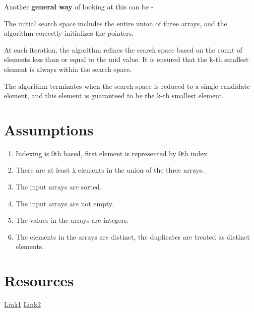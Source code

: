 \documentclass[8pt]{article}
\begin{document}
Another \textbf{general way }of looking at this can be -

The initial search space includes the entire union of three arrays, and the algorithm correctly initializes the pointers.

At each iteration, the algorithm refines the search space based on the count of elements less than or equal to the mid value. It is ensured that the k-th smallest element is always within the search space.

The algorithm terminates when the search space is reduced to a single candidate element, and this element is guaranteed to be the k-th smallest element.

\section{Assumptions} 

\begin{enumerate} 
    \item Indexing is 0th based, first element is represented by 0th index.
    \item There are at least k elements in the union of the three arrays.
    \item The input arrays are sorted.
    \item The input arrays are not empty.
    \item The values in the arrays are integers.
    \item The elements in the arrays are distinct, the duplicates are treated as distinct elements.
\end{enumerate}

\section{Resources} 
\href{https://www.youtube.com/watch?v=YJeoQBevNVo}{Link1}
\href{https://youtu.be/D1oDwWCq50g?si=zRKa1dsZRJ6jetfG}{Link2}
\end{document}
